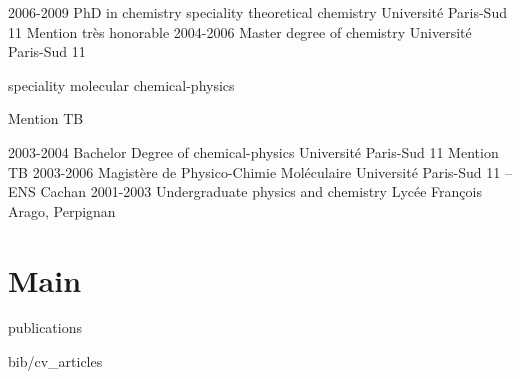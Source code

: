 \documentclass{cv-style}     %
\begin{document}
\begin{entrylist}
\entry
{2006-2009}
{PhD in chemistry {\normalfont speciality theoretical chemistry}}
{Université Paris-Sud 11}
{Mention très honorable}
\entry
{2004-2006}
{Master degree of chemistry}
{Université Paris-Sud 11}
{{\normalfont speciality molecular chemical-physics}\par Mention TB}
\entry
{2003-2004}
{Bachelor Degree of chemical-physics}
{Université Paris-Sud 11}
{Mention TB}
\entry
{2003-2006}
{Magistère de Physico-Chimie Moléculaire}
{Université Paris-Sud 11 -- ENS Cachan}
{\vspace{-4mm}}
\entry
{2001-2003}
{Undergraduate {\normalfont physics and chemistry}}
{Lycée François Arago, Perpignan}
{}
\end{entrylist}

\vspace{-6mm}
\section{Main}{ publications}
\vspace{-0.2cm}
\nocite{aqturin2017_2, santos2017, vallverdu2016, guille2015, Martin2012, Maillet2011, Vallverdu2010}
\begin{btSect}{bib/cv_articles}
    \setlength{\bibsep}{2pt}
    \btPrintCited
\end{btSect}


%
\end{document}
